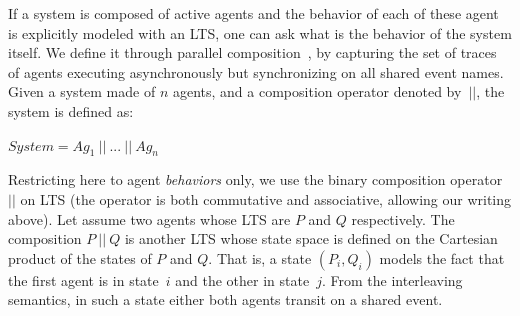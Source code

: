If a system is composed of active agents and the behavior of each of these agent is explicitly modeled with an LTS, one can ask what is the behavior of the system itself. We define it through parallel composition~\cite{Hoare:1985}, by capturing the set of traces of agents executing asynchronously but synchronizing on all shared event names. Given a system made of $n$ agents, and a composition operator denoted by~$||$, the system is defined as:

\begin{center}
$System = Ag_1~||~...~||~Ag_n$ 
\end{center}

Restricting here to agent \emph{behaviors} only, we use the binary composition operator $||$ on LTS (the operator is both commutative and associative, allowing our writing above). Let assume two agents whose LTS are $P$ and $Q$ respectively. The composition $P~||~Q$ is another LTS whose state space is defined on the Cartesian product of the states of $P$ and $Q$. That is, a state $(P_i,Q_i)$ models the fact that the first agent is in state~$i$ and the other in state~$j$. From the interleaving semantics, in such a state either both agents transit on a shared event.



